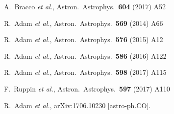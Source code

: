 \begin{thebibliography}{99}
  A.~Bracco {\it et al.},
  Astron.\ Astrophys.\  {\bf 604} (2017) A52


  R.~Adam {\it et al.},
  Astron.\ Astrophys.\  {\bf 569} (2014) A66
  

  R.~Adam {\it et al.},
  Astron.\ Astrophys.\  {\bf 576} (2015) A12
  


  R.~Adam {\it et al.},
  Astron.\ Astrophys.\  {\bf 586} (2016) A122
  
  
  R.~Adam {\it et al.},
  Astron.\ Astrophys.\  {\bf 598} (2017) A115



  F.~Ruppin {\it et al.},
  Astron.\ Astrophys.\  {\bf 597} (2017) A110
  
  R.~Adam {\it et al.},
  arXiv:1706.10230 [astro-ph.CO].




\end{thebibliography}
